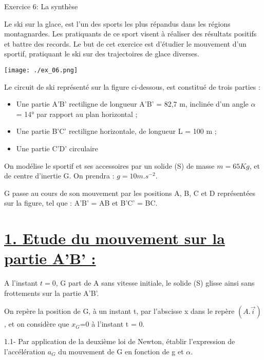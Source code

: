\documentclass[12pt, french]{article}
\begin{document}
\begin{Box2}{Exercice 6: La synthèse }

Le ski sur la glace, est l’un des sports les plus répandus dans les régions montagnardes. Les pratiquants de ce
sport visent à réaliser des résultats positifs et battre des records.
Le but de cet exercice est d’étudier le mouvement d’un sportif, pratiquant le ski sur des trajectoires de glace
diverses.
 \begin{center}
	\texttt{[image: ./ex\_06.png]}
  \end{center}

Le circuit de ski représenté sur la figure ci-dessous, est constitué de trois parties :
\begin{itemize}
	\item Une partie A’B’ rectiligne de longueur  A’B’ = 82,7 m, inclinée d’un angle $\alpha$ = 14° par rapport au plan horizontal ;
	\item  Une partie B’C’ rectiligne horizontale, de longueur L = 100 m ;
	\item  Une partie C’D’ circulaire
\end{itemize}

On modélise le sportif et ses accessoires par un solide (S) de masse $m = 65 Kg$, et de centre d’inertie G.
On prendra : $g = 10 m.s^{-2}$.

G passe au cours de son mouvement par les positions A, B, C et D représentées sur la figure, tel que :
A’B’ = AB et B’C’ = BC.

\section*{\underline{1. Etude du mouvement sur la partie A’B’ :}}
A l’instant $t = 0$, G part de A sans vitesse initiale, le solide (S) glisse ainsi sans frottements sur la
partie A’B’.

On repère la position de G, à un instant t, par l’abscisse x dans le repère $(A.\vec{i})$ , et on considère que $x_G$=0 à l’instant t = 0.

1.1- Par application de la deuxième loi de Newton, établir l’expression de l’accélération $a_G$ du
mouvement de G en fonction de g et $\alpha$.


\end{Box2}
\end{document}
